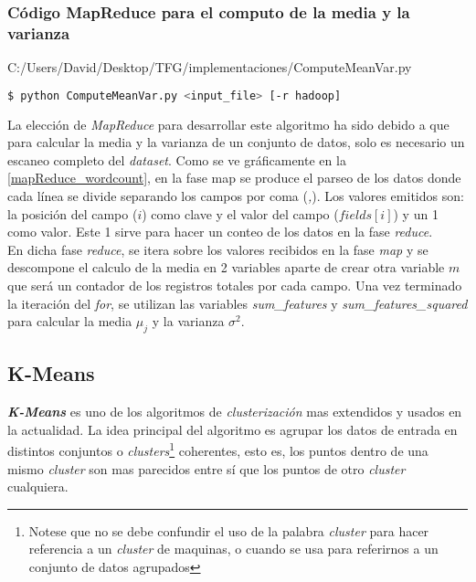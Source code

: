 \newpage  
  
\subsubsection*{Código MapReduce para el computo de la media y la varianza}
  

                {C:/Users/David/Desktop/TFG/implementaciones/ComputeMeanVar.py}

\begin{lstlisting}[language=bash, numbers=none]
$ python ComputeMeanVar.py <input_file> [-r hadoop]
\end{lstlisting}

La elección de \textit{MapReduce} para desarrollar este algoritmo ha sido debido a que para calcular la media y 
la varianza de un conjunto de datos, solo es necesario un escaneo completo del \textit{dataset}. Como se ve
gráficamente en la \autoref{mapReduce_wordcount}, en la fase map se produce el parseo de los datos donde cada línea
se divide separando los campos por coma (\textit{,}). Los valores emitidos son: la posición del campo ($i$) como clave
y el valor del campo ($fields[i]$) y un 1 como valor. Este 1 sirve para hacer un conteo de los datos en la fase 
\textit{reduce}.\\
En dicha fase \textit{reduce}, se itera sobre los valores recibidos en la fase \textit{map} y se descompone el calculo
de la media en 2 variables aparte de crear otra variable $m$ que será un contador de los registros totales por cada campo.
Una vez terminado la iteración del \textit{for}, se utilizan las variables \textit{sum\_features} y 
\textit{sum\_features\_squared} para calcular la media $\mu_j$ y la varianza $\sigma^2$.
  
\newpage

\subsection{K-Means}
\textbf{\textit{K-Means}} es uno de los algoritmos de \textit{clusterización} mas 
extendidos y usados en la actualidad. La idea principal del algoritmo es agrupar los datos de entrada 
en distintos conjuntos o \textit{clusters}\footnote{Notese que no se debe confundir el uso de la 
palabra \textit{cluster} para hacer referencia a un \textit{cluster} de maquinas, o cuando se usa 
para referirnos a un conjunto de datos agrupados} 
coherentes, esto es, los puntos dentro de una mismo \textit{cluster} son mas parecidos entre sí 
que los puntos de otro \textit{cluster} cualquiera.\\
\newline

